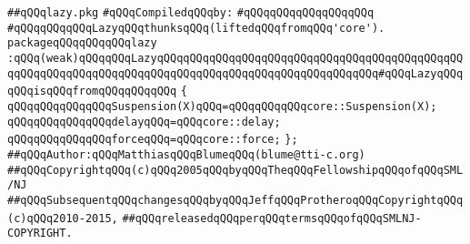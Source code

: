 \label{src/lib/std/src/nj/lazy.pkg}
\verb|##qQQqlazy.pkg|\newline
\newline
\verb|#qQQqCompiledqQQqby:|\newline
\verb|#qQQqqQQqqQQqqQQqqQQq|\newline
\newline
\verb|#qQQqqQQqqQQqLazyqQQqthunksqQQq(liftedqQQqfromqQQq'core').|\newline
\newline
\newline
\verb|packageqQQqqQQqqQQqlazy|\newline
\verb|:qQQq(weak)qQQqqQQqLazyqQQqqQQqqQQqqQQqqQQqqQQqqQQqqQQqqQQqqQQqqQQqqQQqqQQqqQQqqQQqqQQqqQQqqQQqqQQqqQQqqQQqqQQqqQQqqQQqqQQqqQQq#qQQqLazyqQQqqQQqisqQQqfromqQQqqQQqqQQq|\newline
\verb|{|\newline
\verb|qQQqqQQqqQQqqQQqSuspension(X)qQQq=qQQqqQQqqQQqcore::Suspension(X);|\newline
\newline
\verb|qQQqqQQqqQQqqQQqdelayqQQq=qQQqcore::delay;|\newline
\verb|qQQqqQQqqQQqqQQqforceqQQq=qQQqcore::force;|\newline
\verb|};|\newline
\newline
\newline
\verb|##qQQqAuthor:qQQqMatthiasqQQqBlumeqQQq(blume@tti-c.org)|\newline
\verb|##qQQqCopyrightqQQq(c)qQQq2005qQQqbyqQQqTheqQQqFellowshipqQQqofqQQqSML/NJ|\newline
\verb|##qQQqSubsequentqQQqchangesqQQqbyqQQqJeffqQQqProtheroqQQqCopyrightqQQq(c)qQQq2010-2015,|\newline
\verb|##qQQqreleasedqQQqperqQQqtermsqQQqofqQQqSMLNJ-COPYRIGHT.|\newline

